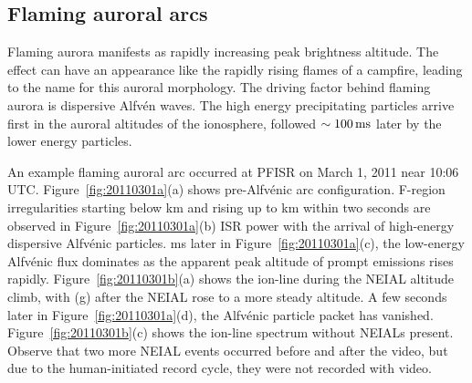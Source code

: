 \subsection{Flaming auroral arcs}\label{sec:fusflame}
Flaming aurora manifests as rapidly increasing peak brightness altitude.
The effect can have an appearance like the rapidly rising flames of a campfire, leading to the name for this auroral morphology.
The driving factor behind flaming aurora is dispersive Alfvén waves.
The high energy precipitating particles arrive first in the auroral altitudes of the ionosphere, followed $\sim \unit[100]{ms}$ later by the lower energy particles. 

An example flaming auroral arc occurred at PFISR on March 1, 2011 near 10:06 UTC. 
Figure~\ref{fig:20110301a}(a) shows pre-Alfvénic arc configuration. 
F-region irregularities starting below \unit[300]{km} and rising up to \unit[600]{km} within two seconds are observed in Figure~\ref{fig:20110301a}(b) ISR power with the arrival of high-energy dispersive Alfvénic particles. 
\unit[400]{ms} later in Figure~\ref{fig:20110301a}(c), the low-energy Alfvénic flux dominates as the apparent peak altitude of prompt emissions rises rapidly. 
Figure~\ref{fig:20110301b}(a) shows the ion-line during the NEIAL altitude climb, with (g) after the NEIAL rose to a more steady altitude.
A few seconds later in Figure~\ref{fig:20110301a}(d), the Alfvénic particle packet has vanished.
Figure~\ref{fig:20110301b}(c) shows the ion-line spectrum without NEIALs present.
Observe that two more NEIAL events occurred before and after the video, but due to the human-initiated record cycle, they were not recorded with video.
